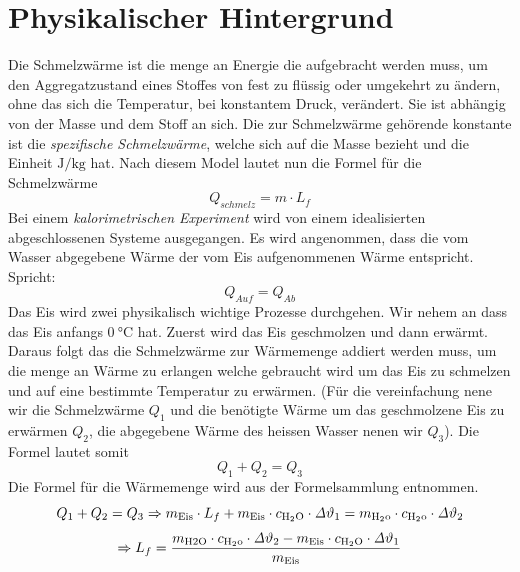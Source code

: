 \documentclass[a4 paper, 11pt]{article}
\begin{document}
\section{Physikalischer Hintergrund}
Die Schmelzwärme ist die menge an Energie die aufgebracht werden muss, um den Aggregatzustand eines Stoffes von fest zu flüssig oder umgekehrt zu ändern, ohne das sich die Temperatur, bei konstantem Druck, verändert. Sie ist abhängig von der Masse und dem Stoff an sich. Die zur Schmelzwärme gehörende konstante ist die \textit{spezifische Schmelzwärme}, welche sich auf die Masse bezieht und die Einheit $\si{\J\per\kg}$ hat. Nach diesem Model lautet nun die Formel für die Schmelzwärme 
$$ Q_{schmelz}= m \cdot L_f$$
Bei einem \textit{kalorimetrischen Experiment} wird von einem idealisierten abgeschlossenen Systeme ausgegangen. Es wird angenommen, dass die vom Wasser abgegebene Wärme der vom Eis aufgenommenen Wärme entspricht. Spricht:
$$ Q_{Auf}=Q_{Ab}$$
Das Eis wird zwei physikalisch wichtige Prozesse durchgehen. Wir nehem an dass das Eis anfangs $\SI{0}{\celsius}$ hat. Zuerst wird das Eis geschmolzen und dann erwärmt. Daraus folgt das die Schmelzwärme zur Wärmemenge addiert werden muss, um die menge an Wärme zu erlangen welche gebraucht wird um das Eis zu schmelzen und auf eine bestimmte Temperatur zu erwärmen. (Für die vereinfachung nene wir die Schmelzwärme $Q_{1}$ und die benötigte Wärme um das geschmolzene Eis zu erwärmen $Q_{2}$, die abgegebene Wärme des heissen Wasser nenen wir $Q_{3}$). Die Formel lautet somit
$$ Q_{1} + Q_{2} = Q_{3} $$
Die Formel für die Wärmemenge wird aus der Formelsammlung entnommen.
$$ Q_{1} + Q_{2} = Q_{3} \Rightarrow m_{\rm{Eis}} \cdot L_f + m_{\rm{Eis}} \cdot c_{\rm{H_2O}} \cdot \mathit{\Delta}\vartheta_1 = m_{\rm{H_2o}} \cdot c_{\rm{H_2o}} \cdot \mathit{\Delta}\vartheta_2$$ $$ \Rightarrow L_f = \frac{m_{\rm{H2O}} \cdot c_{\rm{H_2o}} \cdot \mathit{\Delta}\vartheta_2 - m_{\rm{Eis}} \cdot c_{\rm{H_2O}} \cdot \mathit{\Delta}\vartheta_1}{m_{\rm{Eis}}}$$
\end{document}
